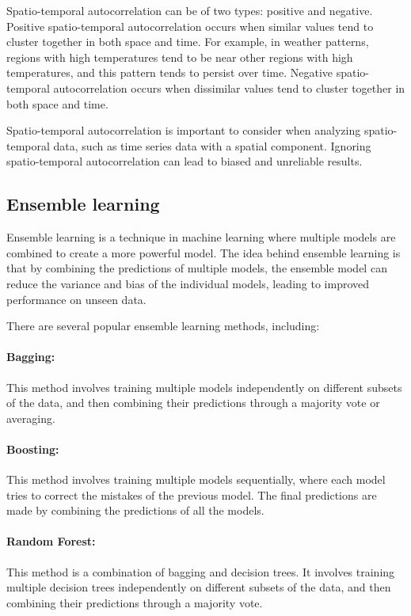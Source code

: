 Spatio-temporal autocorrelation can be of two types: positive and negative. Positive spatio-temporal autocorrelation occurs when similar values tend to cluster together in both space and time. For example, in weather patterns, regions with high temperatures tend to be near other regions with high temperatures, and this pattern tends to persist over time. Negative spatio-temporal autocorrelation occurs when dissimilar values tend to cluster together in both space and time.

Spatio-temporal autocorrelation is important to consider when analyzing spatio-temporal data, such as time series data with a spatial component. Ignoring spatio-temporal autocorrelation can lead to biased and unreliable results.

\subsection{Ensemble learning}
Ensemble learning is a technique in machine learning where multiple models are combined to create a more powerful model. The idea behind ensemble learning is that by combining the predictions of multiple models, the ensemble model can reduce the variance and bias of the individual models, leading to improved performance on unseen data.

There are several popular ensemble learning methods, including:

\paragraph{Bagging:}This method involves training multiple models independently on different subsets of the data, and then combining their predictions through a majority vote or averaging.

\paragraph{Boosting:} This method involves training multiple models sequentially, where each model tries to correct the mistakes of the previous model. The final predictions are made by combining the predictions of all the models.

\paragraph{Random Forest:} This method is a combination of bagging and decision trees. It involves training multiple decision trees independently on different subsets of the data, and then combining their predictions through a majority vote.

